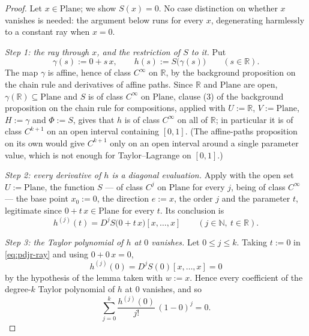 \begin{proof}
Let $x\in\mathrm{Plane}$; we show $S(x)=0$.  No case distinction on whether $x$ vanishes is
needed: the argument below runs for every $x$, degenerating harmlessly to a constant ray when
$x=0$.

\medskip\noindent\emph{Step 1: the ray through $x$, and the restriction of $S$ to it.}
Put
\[
  \gamma(s):=0+s\,x,\qquad h(s):=S\bigl(\gamma(s)\bigr)\qquad(s\in\mathbb{R}).
\]
The map $\gamma$ is affine, hence of class $C^{\infty}$ on $\mathbb{R}$, by the background
proposition on the chain rule and derivatives of affine paths.  Since $\mathbb{R}$ and
$\mathrm{Plane}$ are open, $\gamma(\mathbb{R})\subseteq\mathrm{Plane}$ and $S$ is of class
$C^{\infty}$ on $\mathrm{Plane}$, clause (3) of the background proposition on the chain rule for
compositions, applied with $U:=\mathbb{R}$, $V:=\mathrm{Plane}$, $H:=\gamma$ and $\Phi:=S$,
gives that $h$ is of class $C^{\infty}$ on all of $\mathbb{R}$; in particular it is of class
$C^{k+1}$ on an open interval containing $[0,1]$.  (The affine-paths proposition on its own
would give $C^{k+1}$ only on an open interval around a single parameter value, which is not
enough for Taylor--Lagrange on $[0,1]$.)

\medskip\noindent\emph{Step 2: every derivative of $h$ is a diagonal evaluation.}
Apply  with the open set $U:=\mathrm{Plane}$, the function $S$ ---
of class $C^{j}$ on $\mathrm{Plane}$ for every $j$, being of class $C^{\infty}$ --- the base
point $x_0:=0$, the direction $e:=x$, the order $j$ and the parameter $t$, legitimate since
$0+t\,x\in\mathrm{Plane}$ for every $t$.  Its conclusion is
\begin{equation}\label{eq:pdjr-ray}
  h^{(j)}(t)=D^{j}S\bigl(0+t\,x\bigr)[x,\ldots,x]
  \qquad(j\in\mathbb{N},\ t\in\mathbb{R}).
\end{equation}

\medskip\noindent\emph{Step 3: the Taylor polynomial of $h$ at $0$ vanishes.}
Let $0\le j\le k$.  Taking $t:=0$ in \eqref{eq:pdjr-ray} and using $0+0\,x=0$,
\[
  h^{(j)}(0)=D^{j}S(0)[x,\ldots,x]=0
\]
by the hypothesis of the lemma taken with $w:=x$.  Hence every coefficient of the degree-$k$
Taylor polynomial of $h$ at $0$ vanishes, and so
\begin{equation}\label{eq:pdjr-poly}
  \sum_{j=0}^{k}\frac{h^{(j)}(0)}{j!}\,(1-0)^{j}=0 .
\end{equation}


\end{proof}
